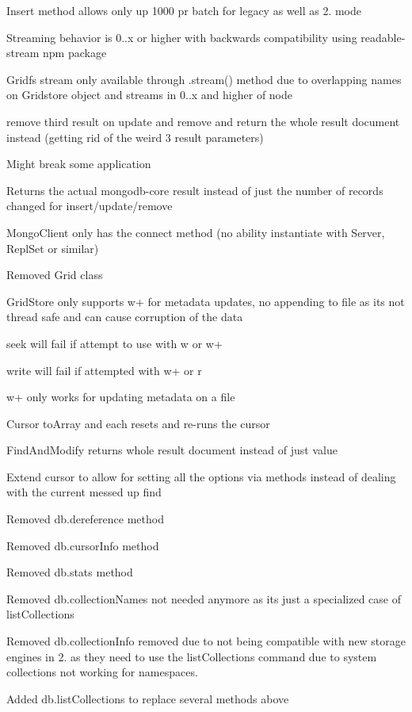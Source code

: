 \begin{DoxyItemize}
\item Insert method allows only up 1000 pr batch for legacy as well as 2. mode
\item Streaming behavior is 0..\+x or higher with backwards compatibility using readable-\/stream npm package
\item Gridfs stream only available through .stream() method due to overlapping names on Gridstore object and streams in 0..\+x and higher of node
\item remove third result on update and remove and return the whole result document instead (getting rid of the weird 3 result parameters)
\begin{DoxyItemize}
\item Might break some application
\end{DoxyItemize}
\item Returns the actual mongodb-\/core result instead of just the number of records changed for insert/update/remove
\item Mongo\+Client only has the connect method (no ability instantiate with Server, Repl\+Set or similar)
\item Removed Grid class
\item Grid\+Store only supports w+ for metadata updates, no appending to file as it\textquotesingle{}s not thread safe and can cause corruption of the data
\begin{DoxyItemize}
\item seek will fail if attempt to use with w or w+
\item write will fail if attempted with w+ or r
\item w+ only works for updating metadata on a file
\end{DoxyItemize}
\item Cursor to\+Array and each resets and re-\/runs the cursor
\item Find\+And\+Modify returns whole result document instead of just value
\item Extend cursor to allow for setting all the options via methods instead of dealing with the current messed up find
\item Removed db.\+dereference method
\item Removed db.\+cursor\+Info method
\item Removed db.\+stats method
\item Removed db.\+collection\+Names not needed anymore as it\textquotesingle{}s just a specialized case of list\+Collections
\item Removed db.\+collection\+Info removed due to not being compatible with new storage engines in 2. as they need to use the list\+Collections command due to system collections not working for namespaces.
\item Added db.\+list\+Collections to replace several methods above
\end{DoxyItemize}

